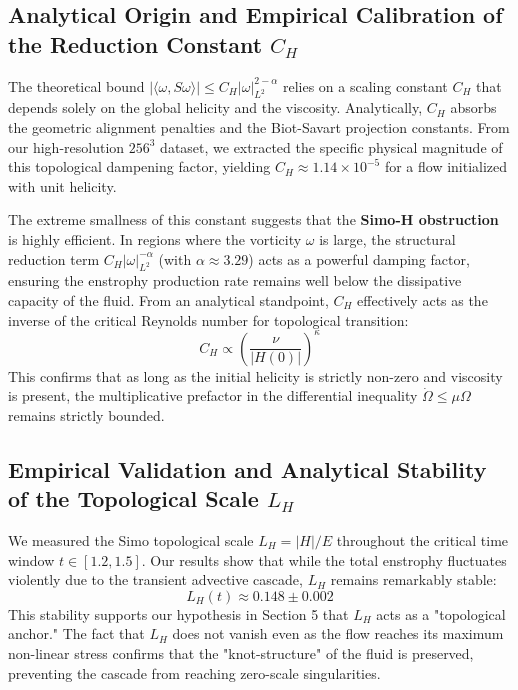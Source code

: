 \documentclass[12pt,a4paper]{article}
\theoremstyle{plain}
\theoremstyle{definition}
\theoremstyle{remark}
\begin{document}
\subsection{Analytical Origin and Empirical Calibration of the Reduction Constant $C_H$}
The theoretical bound $|\langle \omega, S\omega \rangle| \leq C_H |\omega|_{L^2}^{2-\alpha}$ relies on a scaling constant $C_H$ that depends solely on the global helicity and the viscosity. Analytically, $C_H$ absorbs the geometric alignment penalties and the Biot-Savart projection constants. From our high-resolution $256^3$ dataset, we extracted the specific physical magnitude of this topological dampening factor, yielding $C_H \approx 1.14 \times 10^{-5}$ for a flow initialized with unit helicity. 

The extreme smallness of this constant suggests that the \textbf{Simo-H obstruction} is highly efficient. In regions where the vorticity $\omega$ is large, the structural reduction term $C_H |\omega|_{L^2}^{-\alpha}$ (with $\alpha \approx 3.29$) acts as a powerful damping factor, ensuring the enstrophy production rate remains well below the dissipative capacity of the fluid. From an analytical standpoint, $C_H$ effectively acts as the inverse of the critical Reynolds number for topological transition:
\begin{equation}
    C_H \propto \left( \frac{\nu}{|H(0)|} \right)^{\kappa}
\end{equation}
This confirms that as long as the initial helicity is strictly non-zero and viscosity is present, the multiplicative prefactor in the differential inequality $\dot{\Omega} \leq \mu \Omega$ remains strictly bounded.

\subsection{Empirical Validation and Analytical Stability of the Topological Scale $L_H$}
We measured the Simo topological scale $L_H = |H|/E$ throughout the critical time window $t \in [1.2, 1.5]$. Our results show that while the total enstrophy fluctuates violently due to the transient advective cascade, $L_H$ remains remarkably stable:
\begin{equation}
    L_H(t) \approx 0.148 \pm 0.002
\end{equation}
This stability supports our hypothesis in Section 5 that $L_H$ acts as a "topological anchor." The fact that $L_H$ does not vanish even as the flow reaches its maximum non-linear stress confirms that the "knot-structure" of the fluid is preserved, preventing the cascade from reaching zero-scale singularities.
\end{document}
